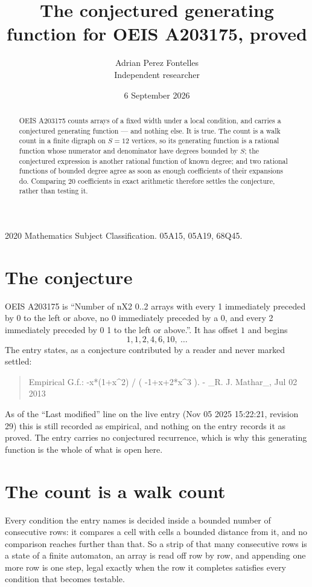 \documentclass[11pt,a4paper]{article}
\title{The conjectured generating function for OEIS A203175, proved}
\author{Adrian Perez Fontelles\\ \small Independent researcher}
\date{6 September 2026}
\theoremstyle{plain}
\theoremstyle{definition}
\begin{document}
\maketitle

\begin{abstract}
OEIS A203175 counts arrays of a fixed width under a local condition, and carries a conjectured
generating function --- and nothing else. It is true. The count is a walk count in a finite
digraph on $S=12$ vertices, so its generating function is a rational function whose numerator
and denominator have degrees bounded by $S$; the conjectured expression is another rational
function of known degree; and two rational functions of bounded degree agree as soon as enough
coefficients of their expansions do. Comparing $20$ coefficients in exact arithmetic
therefore settles the conjecture, rather than testing it.
\end{abstract}

\noindent\small 2020 Mathematics Subject Classification. 05A15, 05A19, 68Q45.\normalsize

\section{The conjecture}

OEIS A203175 is ``Number of nX2 0..2 arrays with every 1 immediately preceded by 0 to the left or above, no 0 immediately preceded by a 0, and every 2 immediately preceded by 0 1 to the left or above.''. It has offset $1$ and begins
\[
1, 1, 2, 4, 6, 10,\ \dots
\]
The entry states, as a conjecture contributed by a reader and never marked settled:
\begin{quote}
Empirical G.f.: -x*(1+x\^{}2) / ( -1+x+2*x\^{}3 ). - \_R. J. Mathar\_, Jul 02 2013
\end{quote}
As of the ``Last modified'' line on the live entry (Nov 05 2025 15:22:21, revision 29) this is still
recorded as empirical, and nothing on the entry records it as proved. The entry carries no
conjectured recurrence, which is why this generating function is the whole of what is open
here.

\section{The count is a walk count}

Every condition the entry names is decided inside a bounded number of consecutive rows: it
compares a cell with cells a bounded distance from it, and no comparison reaches further than
that. So a strip of that many consecutive rows is a state of a finite automaton, an array is
read off row by row, and appending one more row is one step, legal exactly when the row it
completes satisfies every condition that becomes testable.
\end{document}

